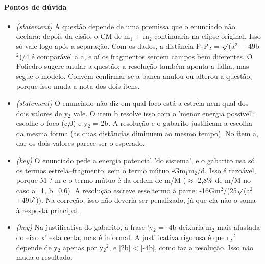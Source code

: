 \documentclass{article}%
\begin{document}
\paragraph{Pontos de dúvida}%
\begin{itemize}%
\item%
\textit{(statement)} A questão depende de uma premissa que o enunciado não declara: depois da cisão, o CM de m$_{1}$ + m$_{2}$ continuaria na elipse original. Isso só vale logo após a separação. Com os dados, a distância P$_{1}$P$_{2}$ = $\surd$(a$^2$ + 49b$^2$)/4 é comparável a a, e aí os fragmentos sentem campos bem diferentes. O Poliedro sugere anular a questão; a resolução também aponta a falha, mas segue o modelo. Convém confirmar se a banca anulou ou alterou a questão, porque isso muda a nota dos dois itens.%
\item%
\textit{(statement)} O enunciado não diz em qual foco está a estrela nem qual dos dois valores de y$_{2}$ vale. O item b resolve isso com o 'menor energia possível': escolhe o foco (c,0) e y$_{2}$ = 2b. A resolução e o gabarito justificam a escolha da mesma forma (as duas distâncias diminuem ao mesmo tempo). No item a, dar os dois valores parece ser o esperado.%
\item%
\textit{(key)} O enunciado pede a energia potencial 'do sistema', e o gabarito usa só os termos estrela--fragmento, sem o termo mútuo -Gm$_{1}$m$_{2}$/d. Isso é razoável, porque M ? m e o termo mútuo é da ordem de m/M ($\approx$ 2,8\% de m/M no caso a=1, b=0,6). A resolução escreve esse termo à parte: -16Gm$^2$/(25$\surd$(a$^2$+49b$^2$)). Na correção, isso não deveria ser penalizado, já que ela não o soma à resposta principal.%
\item%
\textit{(key)} Na justificativa do gabarito, a frase 'y$_{2}$ = -4b deixaria m$_{2}$ mais afastada do eixo x' está certa, mas é informal. A justificativa rigorosa é que r$_{2}$$^2$ depende de y$_{2}$ apenas por y$_{2}$$^2$, e |2b| < |-4b|, como faz a resolução. Isso não muda o resultado.%
\end{itemize}%
\end{document}
